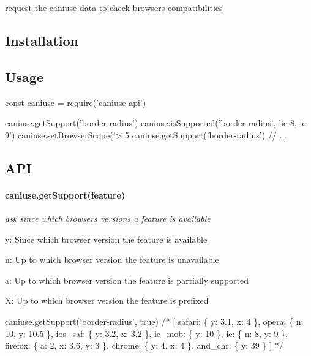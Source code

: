 request the caniuse data to check browsers compatibilities

\subsection*{Installation}




\subsection*{Usage}


\begin{DoxyCode}
const caniuse = require('caniuse-api')

caniuse.getSupport('border-radius')
caniuse.isSupported('border-radius', 'ie 8, ie 9')
caniuse.setBrowserScope('> 5%
caniuse.getSupport('border-radius')
// ...
\end{DoxyCode}


\subsection*{A\+PI}

\paragraph*{{\ttfamily caniuse.\+get\+Support(feature)}}

{\itshape ask since which browsers versions a feature is available}


\begin{DoxyItemize}
\item {\ttfamily y}\+: Since which browser version the feature is available
\item {\ttfamily n}\+: Up to which browser version the feature is unavailable
\item {\ttfamily a}\+: Up to which browser version the feature is partially supported
\item {\ttfamily X}\+: Up to which browser version the feature is prefixed
\end{DoxyItemize}


\begin{DoxyCode}
caniuse.getSupport('border-radius', true)
/*
[ safari: \{ y: 3.1, x: 4 \},
  opera: \{ n: 10, y: 10.5 \},
  ios\_saf: \{ y: 3.2, x: 3.2 \},
  ie\_mob: \{ y: 10 \},
  ie: \{ n: 8, y: 9 \},
  firefox: \{ a: 2, x: 3.6, y: 3 \},
  chrome: \{ y: 4, x: 4 \},
  and\_chr: \{ y: 39 \} ]
*/
\end{DoxyCode}


